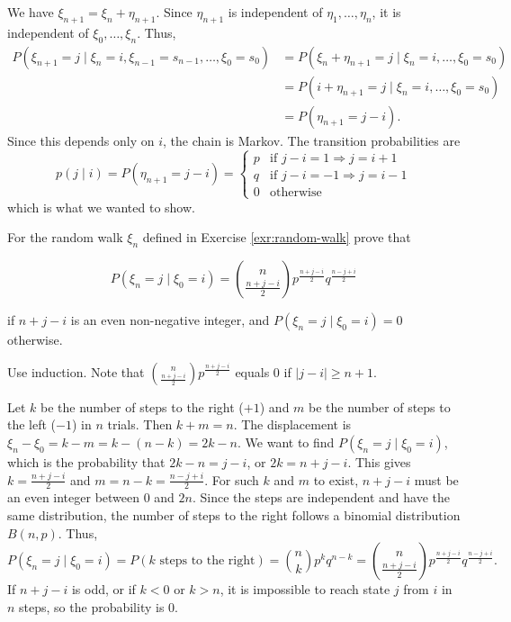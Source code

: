 \begin{Solution}
We have $\xi_{n+1} = \xi_n + \eta_{n+1}$. Since $\eta_{n+1}$ is independent of $\eta_1, \dots, \eta_n$, it is independent of $\xi_0, \dots, \xi_n$. Thus,
\begin{align*}
P(\xi_{n+1} = j \mid \xi_n = i, \xi_{n-1} = s_{n-1}, \dots, \xi_0 = s_0) &= P(\xi_n + \eta_{n+1} = j \mid \xi_n = i, \dots, \xi_0 = s_0) \\
&= P(i + \eta_{n+1} = j \mid \xi_n = i, \dots, \xi_0 = s_0) \\
&= P(\eta_{n+1} = j - i).
\end{align*}
Since this depends only on $i$, the chain is Markov. The transition probabilities are
\[
p(j \mid i) = P(\eta_{n+1} = j - i) = \begin{cases} p & \text{if } j-i=1 \Rightarrow j=i+1 \\ q & \text{if } j-i=-1 \Rightarrow j=i-1 \\ 0 & \text{otherwise} \end{cases}
\]
which is what we wanted to show.
\end{Solution}

\begin{Exercise}
\label{exr:random-walk-binomial}
For the random walk $\xi_n$ defined in Exercise \ref{exr:random-walk} prove that

\begin{equation}
P(\xi_n = j \mid \xi_0 = i) = \binom{n}{\frac{n+j-i}{2}} p^{\frac{n+j-i}{2}} q^{\frac{n-j+i}{2}} \tag{5.19}
\end{equation}

if $n+j-i$ is an even non-negative integer, and $P(\xi_n = j \mid \xi_0 = i) = 0$ otherwise.

\begin{hint}
Use induction. Note that $\binom{n}{\frac{n+j-i}{2}}p^{\frac{n+j-i}{2}}$ equals 0 if $|j-i| \geq n+1$.
\end{hint}
\end{Exercise}

\begin{Solution}
Let $k$ be the number of steps to the right ($+1$) and $m$ be the number of steps to the left ($-1$) in $n$ trials. Then $k+m=n$. The displacement is $\xi_n - \xi_0 = k - m = k - (n - k) = 2k - n$.
We want to find $P(\xi_n = j \mid \xi_0 = i)$, which is the probability that $2k - n = j - i$, or $2k = n + j - i$.
This gives $k = \frac{n+j-i}{2}$ and $m = n - k = \frac{n-j+i}{2}$.
For such $k$ and $m$ to exist, $n+j-i$ must be an even integer between 0 and $2n$.
Since the steps are independent and have the same distribution, the number of steps to the right follows a binomial distribution $B(n, p)$. Thus,
\[
P(\xi_n = j \mid \xi_0 = i) = P(k \text{ steps to the right}) = \binom{n}{k} p^k q^{n-k} = \binom{n}{\frac{n+j-i}{2}} p^{\frac{n+j-i}{2}} q^{\frac{n-j+i}{2}}.
\]
If $n+j-i$ is odd, or if $k < 0$ or $k > n$, it is impossible to reach state $j$ from $i$ in $n$ steps, so the probability is 0.
\end{Solution}

